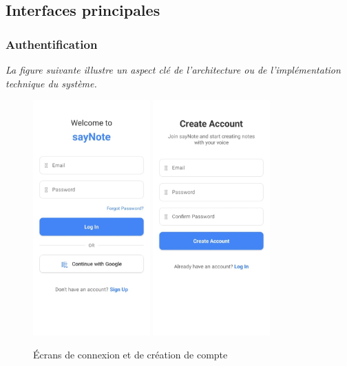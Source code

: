 \vspace{20em} 
\subsection{Interfaces principales}

\subsubsection{Authentification}
\noindent
\textit{La figure suivante illustre un aspect clé de l'architecture ou de l'implémentation technique du système.}
\begin{figure}[H]
    \centering
    \includegraphics[width=0.4\textwidth]{assets/docs/mobile/login-page.jpeg}
    \hfill
    \includegraphics[width=0.4\textwidth]{assets/docs/mobile/create-account-page.jpeg}
    \caption{Écrans de connexion et de création de compte}
    \label{fig:mobile-auth}
\end{figure}

